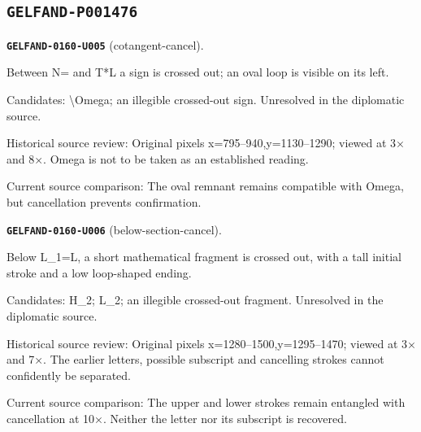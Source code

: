 \subsection*{\texttt{GELFAND-P001476}}
\par\noindent\leavevmode{}\label{GELFAND-0160-U005}\label{GELFAND-P001476:cotangent-cancel}\textbf{\texttt{GELFAND-0160-U005}} (cotangent-cancel).\nopagebreak[4]\par
Between N= and T*L a sign is crossed out; an oval loop is visible on its left.\par
Candidates: \textbackslash{}Omega; an illegible crossed-out sign. Unresolved in the diplomatic source.\par
Historical source review: Original pixels x=795–940,y=1130–1290; viewed at 3× and 8×. Omega is not to be taken as an established reading.\par
Current source comparison: The oval remnant remains compatible with Omega, but cancellation prevents confirmation.\par\medskip
\par\noindent\leavevmode{}\label{GELFAND-0160-U006}\label{GELFAND-P001476:below-section-cancel}\textbf{\texttt{GELFAND-0160-U006}} (below-section-cancel).\nopagebreak[4]\par
Below L\_1=L, a short mathematical fragment is crossed out, with a tall initial stroke and a low loop-shaped ending.\par
Candidates: H\_2; L\_2; an illegible crossed-out fragment. Unresolved in the diplomatic source.\par
Historical source review: Original pixels x=1280–1500,y=1295–1470; viewed at 3× and 7×. The earlier letters, possible subscript and cancelling strokes cannot confidently be separated.\par
Current source comparison: The upper and lower strokes remain entangled with cancellation at 10×. Neither the letter nor its subscript is recovered.\par\medskip
